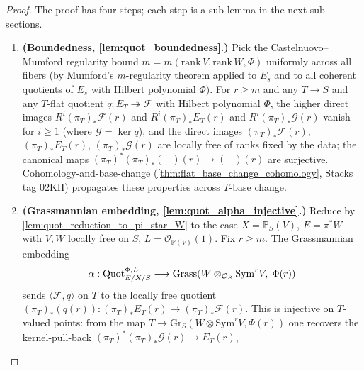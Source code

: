 \begin{proof}
  
  The proof has four steps; each step is a sub-lemma in the next
  sub-sections.
  \begin{enumerate}
    \item \textbf{(Boundedness, \cref{lem:quot_boundedness}.)} Pick the
      Castelnuovo--Mumford regularity bound \(m = m(\mathrm{rank}\,V,
      \mathrm{rank}\,W, \Phi)\) uniformly across all fibers (by Mumford's
      \(m\)-regularity theorem applied to \(E_s\) and to all coherent
      quotients of \(E_s\) with Hilbert polynomial \(\Phi\)). For \(r \ge m\)
      and any \(T \to S\) and any \(T\)-flat quotient
      \(q : E_T \twoheadrightarrow \mathcal{F}\) with Hilbert polynomial
      \(\Phi\), the higher direct images \(R^i (\pi_T)_* \mathcal{F}(r)\)
      and \(R^i (\pi_T)_* E_T(r)\) and \(R^i (\pi_T)_* \mathcal{G}(r)\)
      vanish for \(i \ge 1\) (where \(\mathcal{G} = \ker q\)), and the
      direct images \((\pi_T)_* \mathcal{F}(r)\), \((\pi_T)_* E_T(r)\),
      \((\pi_T)_* \mathcal{G}(r)\) are locally free of ranks fixed by the
      data; the canonical maps \((\pi_T)^* (\pi_T)_*(-)(r) \to (-)(r)\)
      are surjective. Cohomology-and-base-change (\cref{thm:flat_base_change_cohomology},
      Stacks tag 02KH) propagates these properties across \(T\)-base change.
    \item \textbf{(Grassmannian embedding, \cref{lem:quot_alpha_injective}.)}
      Reduce by \cref{lem:quot_reduction_to_pi_star_W} to the case
      \(X = \mathbb{P}_S(V)\), \(E = \pi^* W\) with \(V, W\) locally free
      on \(S\), \(L = \mathcal{O}_{\mathbb{P}(V)}(1)\). Fix \(r \ge m\).
      The Grassmannian embedding
      \[
        \alpha : \operatorname{Quot}^{\Phi,L}_{E/X/S} \longrightarrow
        \mathrm{Grass}\!\left(
          W \otimes_{\mathcal{O}_S} \mathrm{Sym}^r V,\; \Phi(r)
        \right)
      \]
      sends \(\langle \mathcal{F}, q\rangle\) on \(T\) to the locally free
      quotient \((\pi_T)_*(q(r)) : (\pi_T)_* E_T(r) \to (\pi_T)_* \mathcal{F}(r)\).
      This is injective on \(T\)-valued points: from the map \(T \to
      \mathrm{Gr}_S(W \otimes \mathrm{Sym}^r V, \Phi(r))\) one recovers
      the kernel-pull-back \((\pi_T)^* (\pi_T)_* \mathcal{G}(r) \to E_T(r)\),

\end{enumerate}
\end{proof}

